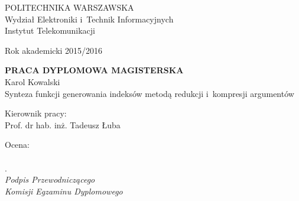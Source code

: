	\newpage
	\thispagestyle{empty}

\begin{flushleft}
	POLITECHNIKA WARSZAWSKA\\
	Wydział Elektroniki i~Technik Informacyjnych\\
	Instytut Telekomunikacji\\
\end{flushleft}

\begin{flushright}
	Rok akademicki 2015/2016
\end{flushright}


\begin{center}
	\begin{minipage}{\textwidth}
	\begin{center}
	\Large \textbf{PRACA DYPLOMOWA MAGISTERSKA} \\
	\vspace{15pt}
	\normalsize {Karol Kowalski} \\
	\vspace{15pt}
	\Large {Synteza funkcji generowania indeksów metodą redukcji i~kompresji argumentów} \\
	\end{center}
	\end{minipage}
\end{center}


\begin{flushright}
	Kierownik pracy:	\\
	Prof. dr hab. inż. Tadeusz Łuba
\end{flushright}

	\hspace{5pt}

\begin{flushleft}
	\begin{minipage}{7cm}
		Ocena: \dotfill \\
		\\. \dotfill \\[-0.7cm]

		\small\textit{Podpis Przewodniczącego\\ Komisji Egzaminu Dyplomowego}
	\end{minipage}
\end{flushleft}
